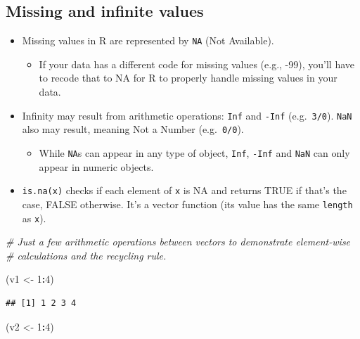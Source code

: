 \documentclass[
]{book}
\newenvironment{Shaded}{\begin{snugshade}}{\end{snugshade}}
\newcommand{\CommentTok}[1]{\textcolor[rgb]{0.56,0.35,0.01}{\textit{#1}}}
\newcommand{\DecValTok}[1]{\textcolor[rgb]{0.00,0.00,0.81}{#1}}
\newcommand{\NormalTok}[1]{#1}
\newcommand{\OtherTok}[1]{\textcolor[rgb]{0.56,0.35,0.01}{#1}}
\newcommand{\SpecialCharTok}[1]{\textcolor[rgb]{0.81,0.36,0.00}{\textbf{#1}}}
\providecommand{\tightlist}{%
  \setlength{\itemsep}{0pt}\setlength{\parskip}{0pt}}
\begin{document}
\hypertarget{missing-and-infinite-values}{%
\subsection{Missing and infinite values}\label{missing-and-infinite-values}}

\begin{itemize}
\tightlist
\item
  Missing values in R are represented by \texttt{NA} (Not Available).

  \begin{itemize}
  \tightlist
  \item
    If your data has a different code for missing values (e.g., -99), you'll have to recode that to NA for R to properly handle missing values in your data.
  \end{itemize}
\item
  Infinity may result from arithmetic operations: \texttt{Inf} and \texttt{-Inf} (e.g.~\texttt{3/0}). \texttt{NaN} also may result, meaning Not a Number (e.g.~\texttt{0/0}).

  \begin{itemize}
  \tightlist
  \item
    While \texttt{NA}s can appear in any type of object, \texttt{Inf}, \texttt{-Inf} and \texttt{NaN} can only appear in numeric objects.
  \end{itemize}
\item
  \texttt{is.na(x)} checks if each element of \texttt{x} is NA and returns TRUE if that's the case, FALSE otherwise. It's a vector function (its value has the same \texttt{length} as \texttt{x}).
\end{itemize}

\begin{Shaded}
\begin{Highlighting}[]
\CommentTok{\# Just a few arithmetic operations between vectors to demonstrate element{-}wise}
\CommentTok{\# calculations and the recycling rule.}

\NormalTok{(v1 }\OtherTok{\textless{}{-}} \DecValTok{1}\SpecialCharTok{:}\DecValTok{4}\NormalTok{)}
\end{Highlighting}
\end{Shaded}

\begin{verbatim}
## [1] 1 2 3 4
\end{verbatim}

\begin{Shaded}
\begin{Highlighting}[]
\NormalTok{(v2 }\OtherTok{\textless{}{-}} \DecValTok{1}\SpecialCharTok{:}\DecValTok{4}\NormalTok{)}
\end{Highlighting}
\end{Shaded}
\end{document}

